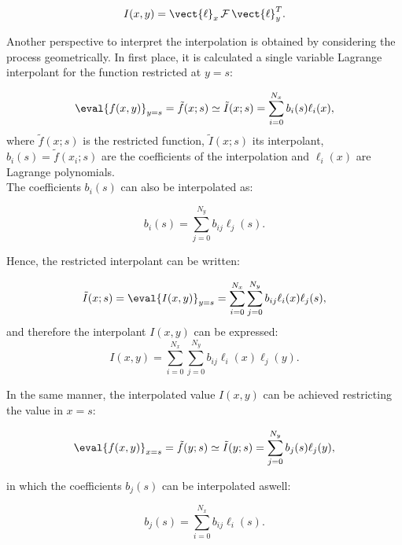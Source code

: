      \begin{equation}
     	I(x,y) =  \vect{\ell}_x \, \mathcal{F} \, \vect{\ell}_y^T .
     \end{equation}
     
     
     Another perspective to interpret the interpolation is obtained by considering the process geometrically. In first place, it is calculated a single variable Lagrange interpolant
     for the function restricted at $y=s$:
     
     \begin{equation}
     \eval{f(x,y)}_{y=s} = \tilde{f}(x;s)  \simeq \tilde{I}(x;s) = \sum_{i=0}^{N_x} b_i(s) \ell_i(x),
     \end{equation}
     where $\tilde{f}(x;s)$ is the restricted function, $\tilde{I}(x;s)$ its interpolant, $b_i(s) = \tilde{f}(x_i;s)$ are the coefficients of the interpolation and $\ell_i(x)$ are Lagrange polynomials. \\
     
     The coefficients $b_i(s)$ can also be interpolated as:
     
     \begin{equation}
     b_i(s) = \sum_{j=0}^{N_y} b_{ij} \ell_j(s) .
     \end{equation}
     
     Hence, the restricted interpolant can be written:
     
     \begin{equation}
     \tilde{I}(x;s) = \eval{I(x,y)}_{y=s} =\sum_{i=0}^{N_x} \sum_{j=0}^{N_y} b_{ij} \ell_i(x) \ell_j(s) ,
     \end{equation}
     and therefore the interpolant $I(x,y)$ can be expressed:
     \begin{equation}
     {I}(x,y) = \sum_{i=0}^{N_x} \sum_{j=0}^{N_y} b_{ij} \ell_i(x) \ell_j(y) .
     \end{equation}
     
     In the same manner, the interpolated value $I(x,y)$ can be achieved restricting the value in $x=s$:
     
     \begin{equation}
     \eval{f(x,y)}_{x=s} = \tilde{f}(y;s)  \simeq \tilde{I}(y;s) = \sum_{j=0}^{N_y} b_j(s) \ell_j(y),
     \end{equation}
     
     in which the coefficients $b_j(s)$ can be interpolated aswell:
     
     \begin{equation}
     b_j(s) = \sum_{i=0}^{N_x} b_{ij} \ell_i(s) .
     \end{equation}
     
